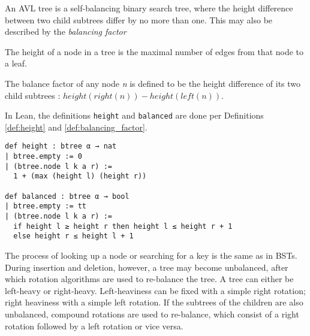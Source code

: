 An AVL tree \cite*{avl:original} is a self-balancing binary search tree, where the height difference between two child subtrees differ by no more than one.
This may also be described by the \textit{balancing factor} 

\begin{definition}
  \label{def:height}
  The height of a node in a tree is the maximal number of edges from that node to a leaf.
\end{definition}

\begin{definition}
  \label{def:balancing_factor}
  The balance factor of any node \textit{n} is defined to be the height difference of its two child subtrees : $height (right(n)) - height(left(n))$.
\end{definition}

In Lean, the definitions \lstinline{height} and \lstinline{balanced} are done per Definitions \ref{def:height} and \ref{def:balancing_factor}.

\begin{lstlisting}[caption=\empty]
def height : btree α → nat
| btree.empty := 0
| (btree.node l k a r) :=
  1 + (max (height l) (height r))

def balanced : btree α → bool
| btree.empty := tt
| (btree.node l k a r) :=
  if height l ≥ height r then height l ≤ height r + 1
  else height r ≤ height l + 1
\end{lstlisting}

The process of looking up a node or searching for a key is the same as in BSTs. During insertion and deletion, however, a tree may become unbalanced, after which rotation algorithms are used to re-balance the tree. A tree can either be left-heavy or right-heavy. Left-heaviness can be fixed with a simple right rotation; right heaviness with a simple left rotation. If the subtrees of the children are also unbalanced, compound rotations are used to re-balance, which consist of a right rotation followed by a left rotation or vice versa.

